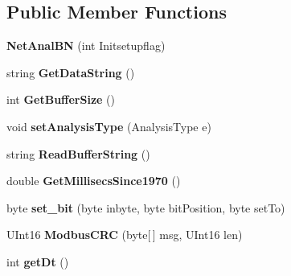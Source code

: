 \subsection*{Public Member Functions}
\begin{DoxyCompactItemize}
\item 
\mbox{\label{class_b_n_a30_1_1_net_anal_b_n_ac6adbb50402e967e06dab2a9173374b1}} 
{\bfseries Net\+Anal\+BN} (int Initsetupflag)
\item 
\mbox{\label{class_b_n_a30_1_1_net_anal_b_n_aeeb232114e65f89d4bdfb15da123a3c4}} 
string {\bfseries Get\+Data\+String} ()
\item 
\mbox{\label{class_b_n_a30_1_1_net_anal_b_n_aae71ac4b5991560ef3682210ee1889e0}} 
int {\bfseries Get\+Buffer\+Size} ()
\item 
\mbox{\label{class_b_n_a30_1_1_net_anal_b_n_a17f1b22e9fb4b6006614025ad0c3ad8a}} 
void {\bfseries set\+Analysis\+Type} (Analysis\+Type e)
\item 
\mbox{\label{class_b_n_a30_1_1_net_anal_b_n_a151f3b25b68c816c0ff4e53bd75ad377}} 
string {\bfseries Read\+Buffer\+String} ()
\item 
\mbox{\label{class_b_n_a30_1_1_net_anal_b_n_a8cceea2d3ebade0448bcbb42270f2de7}} 
double {\bfseries Get\+Millisecs\+Since1970} ()
\item 
\mbox{\label{class_b_n_a30_1_1_net_anal_b_n_ad77a57eb0168a30835b93867f71a21da}} 
byte {\bfseries set\+\_\+bit} (byte inbyte, byte bit\+Position, byte set\+To)
\item 
\mbox{\label{class_b_n_a30_1_1_net_anal_b_n_af10ad8fdeb343d4cb9545e5b335326fb}} 
U\+Int16 {\bfseries Modbus\+C\+RC} (byte\mbox{[}$\,$\mbox{]} msg, U\+Int16 len)
\item 
\mbox{\label{class_b_n_a30_1_1_net_anal_b_n_a6f270d77a3cfd5800b51ee05a5fc9cff}} 
int {\bfseries get\+Dt} ()
\item 

\end{DoxyCompactItemize}
